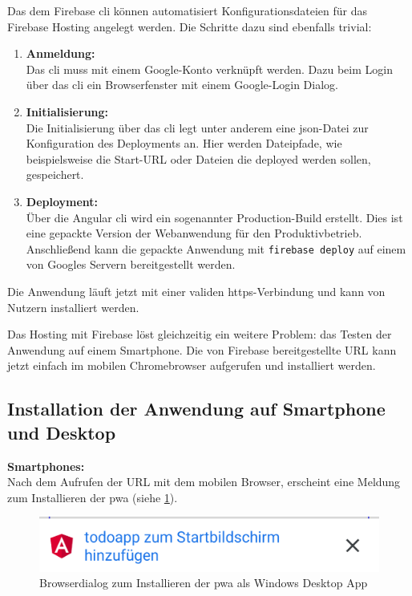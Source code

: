 Das dem Firebase \ac{cli} können automatisiert Konfigurationsdateien für das Firebase Hosting angelegt werden. Die Schritte dazu sind ebenfalls trivial:
\begin{enumerate}
	\item \textbf{Anmeldung: \\}
	      Das \ac{cli} muss mit einem Google-Konto verknüpft werden. Dazu beim Login über das \ac{cli} ein Browserfenster mit einem Google-Login Dialog.
	\item \textbf{Initialisierung: \\}
	      Die Initialisierung über das \ac{cli} legt unter anderem eine \ac{json}-Datei zur Konfiguration des Deployments an. Hier werden Dateipfade, wie beispielsweise die Start-URL oder Dateien die deployed werden sollen, gespeichert.
	\item \textbf{Deployment: \\}
	      Über die Angular \ac{cli} wird ein sogenannter Production-Build erstellt. Dies ist eine gepackte Version der Webanwendung für den Produktivbetrieb.
	      Anschließend kann die gepackte Anwendung mit \texttt{firebase deploy} auf einem von Googles Servern bereitgestellt werden.
\end{enumerate}

Die Anwendung läuft jetzt mit einer validen \ac{https}-Verbindung und kann von Nutzern installiert werden.

Das Hosting mit Firebase löst gleichzeitig ein weitere Problem: das Testen der Anwendung auf einem Smartphone. Die von Firebase bereitgestellte URL kann jetzt einfach im mobilen Chromebrowser aufgerufen und installiert werden.

\subsection{Installation der Anwendung auf Smartphone und Desktop}
\textbf{Smartphones:}\\
Nach dem Aufrufen der URL mit dem mobilen Browser, erscheint eine Meldung zum Installieren der \ac{pwa} (siehe \ref{fig:dialog_install_pwa_mobile}).

\begin{figure}[h!]
	\includegraphics[scale=0.5]{img/pwa_add_to_homescreen.png}
	\centering
	\caption{Browserdialog zum Installieren der \ac{pwa} als Windows Desktop App}
	\label{fig:dialog_install_pwa_mobile}
\end{figure}

